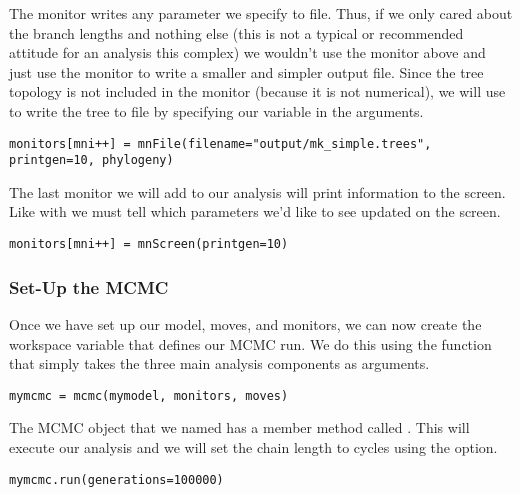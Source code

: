 The  monitor writes any parameter we specify to file.
Thus, if we only cared about the branch lengths and nothing else (this is not a typical or recommended attitude for an analysis this complex) we wouldn't use the  monitor above and just use the  monitor to write a smaller and simpler output file.
Since the tree topology is not included in the  monitor (because it is not numerical), we will use  to write the tree to file by specifying our  variable in the arguments.
{\tt \begin{snugshade*}
\begin{lstlisting}
monitors[mni++] = mnFile(filename="output/mk_simple.trees", printgen=10, phylogeny)
\end{lstlisting}
\end{snugshade*}}

The last monitor we will add to our analysis will print information to the screen.
Like with  we must tell  which parameters we'd like to see updated on the screen. 
{\tt \begin{snugshade*}
\begin{lstlisting}
monitors[mni++] = mnScreen(printgen=10)
\end{lstlisting}
\end{snugshade*}}

\medskip
\subsubsection{Set-Up the MCMC}

Once we have set up our model, moves, and monitors, we can now create the workspace variable that defines our MCMC run. 
We do this using the  function that simply takes the three main analysis components as arguments.
{\tt \begin{snugshade*}
\begin{lstlisting}
mymcmc = mcmc(mymodel, monitors, moves)\end{lstlisting}
\end{snugshade*}}

The MCMC object that we named  has a member method called . 
This will execute our analysis and we will set the chain length to  cycles using the  option.
{\tt \begin{snugshade*}
\begin{lstlisting}
mymcmc.run(generations=100000)
\end{lstlisting}
\end{snugshade*}}

